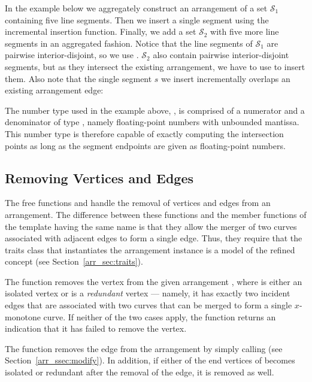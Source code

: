 In the example below we aggregately construct an arrangement of a set
${\mathcal S}_1$ containing five line segments. Then we insert a single
segment using the incremental insertion function. Finally, we add a set
${\mathcal S}_2$ with five more line segments in an aggregated fashion.
Notice that the line segments of ${\mathcal S}_1$ are pairwise
interior-disjoint, so we use .
${\mathcal S}_2$ also contain pairwise interior-disjoint segments,
but as they intersect the existing arrangement, we have to use
 to insert them. Also note that the
single segment $s$ we insert incrementally overlaps an existing
arrangement edge:


The number type used in the example above,
, is comprised of a numerator and a
denominator of type , namely floating-point numbers
with unbounded mantissa. This number type is therefore capable of
exactly computing the intersection points as long as the segment
endpoints are given as floating-point numbers.

\subsection{Removing Vertices and Edges}
\label{arr_ssec:gl_remove}

The free functions  and  handle
the removal of vertices and edges from an arrangement. The difference
between these functions and the member functions of the 
template having the same name is that they allow the merger of two curves
associated with adjacent edges to form a single edge. Thus, they require
that the traits class that instantiates the arrangement instance is a model
of the refined  concept (see
Section~\ref{arr_sec:traits}).

The function  removes the vertex
 from the given arrangement , where  is
either an isolated vertex or is a {\em redundant} vertex ---
namely, it has exactly two incident edges that are associated with
two curves that can be merged to form a single $x$-monotone curve.
If neither of the two cases apply, the function returns an
indication that it has failed to remove the vertex.

The function  removes the edge 
from the arrangement by simply calling 
(see Section~\ref{arr_ssec:modify}). In addition, if either of the
end vertices of  becomes isolated or redundant after the removal
of the edge, it is removed as well.

